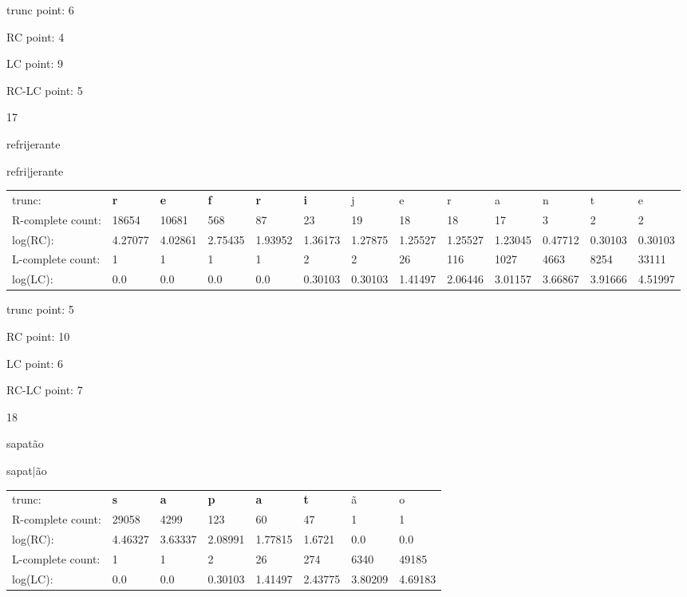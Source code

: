 \documentclass{article}
\begin{document}
trunc point: 6

RC point: 4

LC point: 9

RC-LC point: 5

\vspace{3em}



17

refrijerante

refri$|$jerante

\vspace{1em}

\begin{tabular}{l|llllllllllll}

trunc: & {\color{red}\bf r} & {\color{red}\bf e} & {\color{red}\bf f} & {\color{red}\bf r} & {\color{red}\bf i} & j & e & r & a & n & t & e \\ 
R-complete count: & 18654 & 10681 & 568 & 87 & 23 & 19 & 18 & 18 & 17 & 3 & 2 & 2 \\ 
log(RC): & 4.27077 & 4.02861 & 2.75435 & 1.93952 & 1.36173 & 1.27875 & 1.25527 & 1.25527 & 1.23045 & 0.47712 & 0.30103 & 0.30103 \\ 
L-complete count: & 1 & 1 & 1 & 1 & 2 & 2 & 26 & 116 & 1027 & 4663 & 8254 & 33111 \\ 
log(LC): & 0.0 & 0.0 & 0.0 & 0.0 & 0.30103 & 0.30103 & 1.41497 & 2.06446 & 3.01157 & 3.66867 & 3.91666 & 4.51997 \\ 
\end{tabular}

trunc point: 5

RC point: 10

LC point: 6

RC-LC point: 7

\vspace{3em}



18

sapatão

sapat$|$ão

\vspace{1em}

\begin{tabular}{l|lllllll}

trunc: & {\color{red}\bf s} & {\color{red}\bf a} & {\color{red}\bf p} & {\color{red}\bf a} & {\color{red}\bf t} & ã & o \\ 
R-complete count: & 29058 & 4299 & 123 & 60 & 47 & 1 & 1 \\ 
log(RC): & 4.46327 & 3.63337 & 2.08991 & 1.77815 & 1.6721 & 0.0 & 0.0 \\ 
L-complete count: & 1 & 1 & 2 & 26 & 274 & 6340 & 49185 \\ 
log(LC): & 0.0 & 0.0 & 0.30103 & 1.41497 & 2.43775 & 3.80209 & 4.69183 \\ 
\end{tabular}
\end{document}
